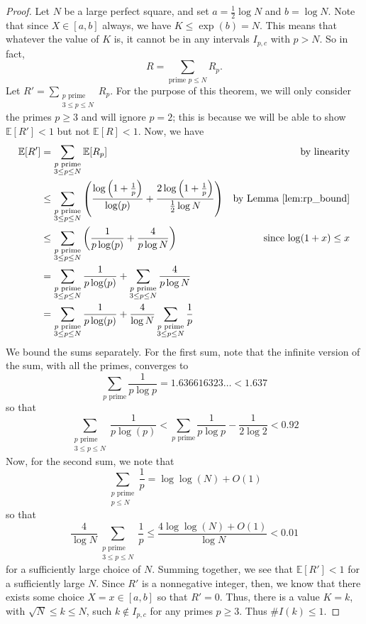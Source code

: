 \documentclass{article}
\newcommand{\E}{\mathbb{E}}
\theoremstyle{definition}
\theoremstyle{remark}
\numberwithin{equation}{section}
\numberwithin{case}{theorem}
\begin{document}
\begin{proof}
    Let $N$ be a large perfect square, and set $a = \frac12 \log N$ and $b = \log N$. Note that since $X \in [a, b]$ always, we have $K \leq \exp(b) = N$. This means that whatever the value of $K$ is, it cannot be in any intervals $I_{p, c}$ with $p > N$. So in fact,
    \[
        R = \sum_{\text{prime }p \leq N} R_p.
    \]
    Let $R' = \sum_{{\substack{p \text{ prime} \\ 3 \leq p \leq N}}} R_p$. For the purpose of this theorem, we will only consider the primes $p \geq 3$ and will ignore $p =2$; this is because we will be able to show $\E[R'] < 1$ but not $\E[R] < 1$. Now, we have
    \begin{align*}
        \E[R'] &= \sum_{\substack{p \text{ prime} \\ 3 \leq p \leq N}} \E[R_p] &\text{by linearity} \\
        &\leq \sum_{\substack{p \text{ prime} \\ 3 \leq p \leq N}} \left( \frac{\log\left(1 + \frac{1}{p}\right)}{\log(p)} + \frac{2\log\left(1 + \frac{1}{p}\right)}{\frac12 \log N} \right) &\text{by Lemma~\ref{lem:rp_bound}} \\
        &\leq \sum_{\substack{p \text{ prime} \\ 3 \leq p \leq N}} \left( \frac{1}{p\log(p)} + \frac{4}{p \log N} \right) &\text{since $\log(1+x) \leq x$} \\
        &= \sum_{\substack{p \text{ prime} \\ 3 \leq p \leq N}}  \frac{1}{p\log(p)} + \sum_{\substack{p \text{ prime} \\ 3 \leq p \leq N}} \frac{4}{p \log N} \\
        &= \sum_{\substack{p \text{ prime} \\ 3 \leq p \leq N}}  \frac{1}{p\log(p)} + \frac{4}{\log N}\sum_{\substack{p \text{ prime} \\ 3 \leq p \leq N}} \frac{1}{p}
    \end{align*}
    We bound the sums separately. For the first sum, note that the infinite version of the sum, with all the primes, converges to \cite{mathar2018digits}
    \[
        \sum_{p \text { prime}} \frac{1}{p \log p} = 1.636616323\dots < 1.637
    \]
    so that
    \[
        \sum_{\substack{p \text{ prime} \\ 3 \leq p \leq N}}  \frac{1}{p\log(p)} < \sum_{p \text { prime}} \frac{1}{p \log p} - \frac{1}{2 \log 2} < 0.92
    \]
    Now, for the second sum, we note that
    \[
        \sum_{\substack{p \text{ prime} \\ p \leq N}} \frac{1}{p} = \log\log(N) + O(1)
    \]
    so that
    \[
        \frac{4}{\log N} \sum_{\substack{p \text{ prime} \\ 3 \leq p \leq N}} \frac{1}{p} \leq \frac{4 \log \log (N) + O(1)}{\log N} < 0.01
    \]
    for a sufficiently large choice of $N$. Summing together, we see that $\E[R'] < 1$ for a sufficiently large $N$. Since $R'$ is a nonnegative integer, then, we know that there exists some choice $X = x \in [a, b]$ so that $R' = 0$. Thus, there is a value $K = k$, with $\sqrt{N} \leq k \leq N$, such $k \notin I_{p, c}$ for any primes $p \geq 3$. Thus $\#I(k) \leq 1$.


\end{proof}
\end{document}
